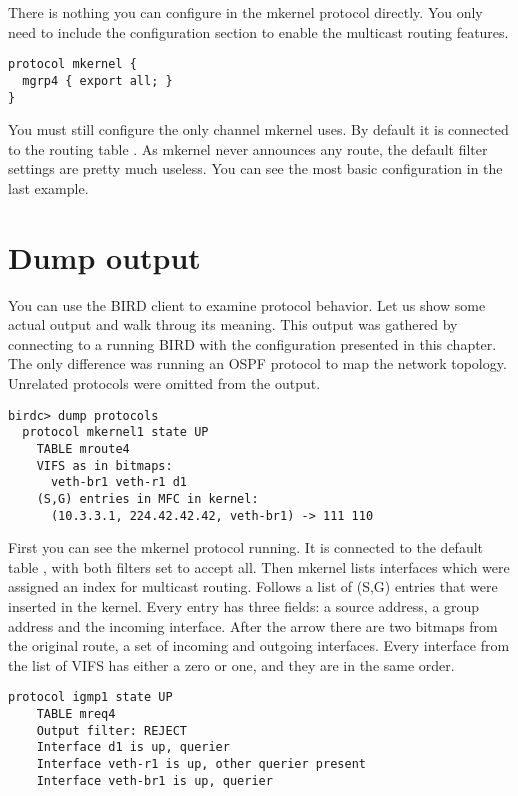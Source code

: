 There is nothing you can configure in the mkernel protocol directly. You only
need to include the configuration section to enable the multicast routing
features.

\begin{lstlisting}
protocol mkernel {
  mgrp4 { export all; }
}
\end{lstlisting}

\noindent You must still configure the only channel mkernel uses. By default it
is connected to the routing table . As mkernel never announces any
route, the default filter settings are pretty much useless. You can see the
most basic configuration in the last example.

\section{Dump output}
You can use the BIRD client to examine protocol behavior. Let us show some
actual output and walk throug its meaning. This output was gathered by
connecting to a running BIRD with the configuration presented in this chapter.
The only difference was running an OSPF protocol to map the network topology.
Unrelated protocols were omitted from the output.

\begin{lstlisting}
birdc> dump protocols
  protocol mkernel1 state UP
    TABLE mroute4
    VIFS as in bitmaps:
      veth-br1 veth-r1 d1
    (S,G) entries in MFC in kernel:
      (10.3.3.1, 224.42.42.42, veth-br1) -> 111 110
\end{lstlisting}

First you can see the mkernel protocol running. It is connected to the default
table , with both filters set to accept all. Then mkernel lists
interfaces which were assigned an index for multicast routing. Follows a list
of (S,G) entries that were inserted in the kernel. Every entry has three
fields: a source address, a group address and the incoming interface. After the
arrow there are two bitmaps from the original route, a set of incoming and
outgoing interfaces. Every interface from the list of VIFS has either a zero or
one, and they are in the same order.

\begin{lstlisting}[firstnumber=8]
  protocol igmp1 state UP
    TABLE mreq4
    Output filter: REJECT
    Interface d1 is up, querier
    Interface veth-r1 is up, other querier present
    Interface veth-br1 is up, querier
\end{lstlisting}


